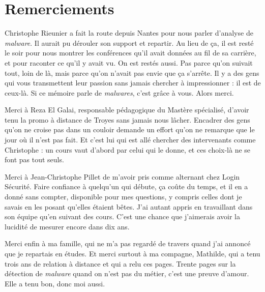 \chapter*{Remerciements}

Christophe Rieunier a fait la route depuis Nantes pour nous parler d'analyse de
\emph{malware}. Il aurait pu dérouler son support et repartir. Au lieu de ça, il
est resté le soir pour nous montrer les conférences qu'il avait données au fil de
sa carrière, et pour raconter ce qu'il y avait vu. On est restés aussi. Pas parce
qu'on suivait tout, loin de là, mais parce qu'on n'avait pas envie que ça
s'arrête. Il y a des gens qui vous transmettent leur passion sans jamais chercher
à impressionner : il est de ceux-là. Si ce mémoire parle de \emph{malwares}, c'est
grâce à vous. Alors merci.

Merci à Reza El Galai, responsable pédagogique du Mastère spécialisé, d'avoir tenu
la promo à distance de Troyes sans jamais nous lâcher. Encadrer des gens qu'on ne
croise pas dans un couloir demande un effort qu'on ne remarque que le jour où il
n'est pas fait. Et c'est lui qui est allé chercher des intervenants comme
Christophe : un cours vaut d'abord par celui qui le donne, et ces choix-là ne se
font pas tout seuls.

Merci à Jean-Christophe Pillet de m'avoir pris comme alternant chez Login
Sécurité. Faire confiance à quelqu'un qui débute, ça coûte du temps, et il en a
donné sans compter, disponible pour mes questions, y compris celles dont je savais
en les posant qu'elles étaient bêtes. J'ai autant appris en travaillant dans son
équipe qu'en suivant des cours. C'est une chance que j'aimerais avoir la lucidité
de mesurer encore dans dix ans.

Merci enfin à ma famille, qui ne m'a pas regardé de travers quand j'ai annoncé que
je repartais en études. Et merci surtout à ma compagne, Mathilde, qui a tenu trois ans de
relation à distance et qui a relu ces pages. Trente pages sur la détection de
\emph{malware} quand on n'est pas du métier, c'est une preuve d'amour. Elle a tenu
bon, donc moi aussi.